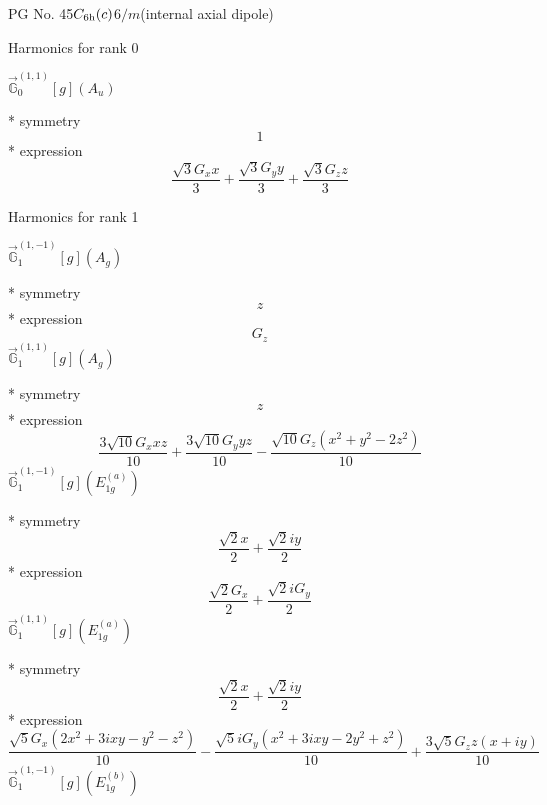 \documentclass[fleqn,8pt]{jsarticle}
\begin{document}
\setcounter{MaxMatrixCols}{32}

\renewcommand{\tablename}{Table~}
\renewcommand{\figurename}{Figure~}
\begin{center}
\LARGE
PG No. 45\quad$C_{\rm 6h}(c)$\quad$6/m$\quad[ hexagonal ] (internal axial dipole)
\end{center}

\noindent * Harmonics for rank 0

\noindent\quad $\vec{\mathbb{G}}_{0}^{(1,1)}[g](A_{u})$

\noindent\quad ** symmetry
\begin{dmath*}
1
\end{dmath*}
\noindent\quad ** expression
\begin{dmath*}
\frac{\sqrt{3} G_{x} x}{3} + \frac{\sqrt{3} G_{y} y}{3} + \frac{\sqrt{3} G_{z} z}{3}
\end{dmath*}

\noindent * Harmonics for rank 1

\noindent\quad $\vec{\mathbb{G}}_{1}^{(1,-1)}[g](A_{g})$

\noindent\quad ** symmetry
\begin{dmath*}
z
\end{dmath*}
\noindent\quad ** expression
\begin{dmath*}
G_{z}
\end{dmath*}
\noindent\quad $\vec{\mathbb{G}}_{1}^{(1,1)}[g](A_{g})$

\noindent\quad ** symmetry
\begin{dmath*}
z
\end{dmath*}
\noindent\quad ** expression
\begin{dmath*}
\frac{3 \sqrt{10} G_{x} x z}{10} + \frac{3 \sqrt{10} G_{y} y z}{10} - \frac{\sqrt{10} G_{z} \left(x^{2} + y^{2} - 2 z^{2}\right)}{10}
\end{dmath*}
\noindent\quad $\vec{\mathbb{G}}_{1}^{(1,-1)}[g](E_{1g}^{(a)})$

\noindent\quad ** symmetry
\begin{dmath*}
\frac{\sqrt{2} x}{2} + \frac{\sqrt{2} i y}{2}
\end{dmath*}
\noindent\quad ** expression
\begin{dmath*}
\frac{\sqrt{2} G_{x}}{2} + \frac{\sqrt{2} i G_{y}}{2}
\end{dmath*}
\noindent\quad $\vec{\mathbb{G}}_{1}^{(1,1)}[g](E_{1g}^{(a)})$

\noindent\quad ** symmetry
\begin{dmath*}
\frac{\sqrt{2} x}{2} + \frac{\sqrt{2} i y}{2}
\end{dmath*}
\noindent\quad ** expression
\begin{dmath*}
\frac{\sqrt{5} G_{x} \left(2 x^{2} + 3 i x y - y^{2} - z^{2}\right)}{10} - \frac{\sqrt{5} i G_{y} \left(x^{2} + 3 i x y - 2 y^{2} + z^{2}\right)}{10} + \frac{3 \sqrt{5} G_{z} z \left(x + i y\right)}{10}
\end{dmath*}
\noindent\quad $\vec{\mathbb{G}}_{1}^{(1,-1)}[g](E_{1g}^{(b)})$
\end{document}
